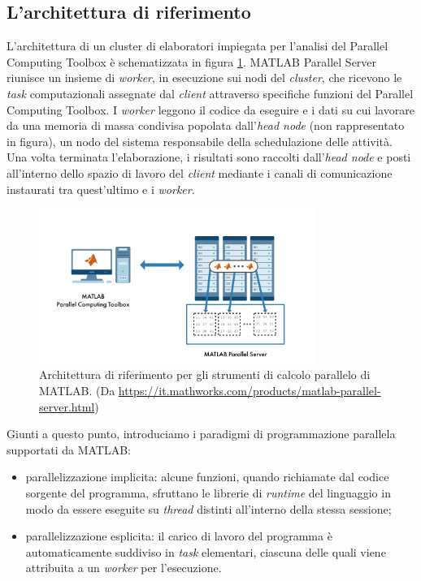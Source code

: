 \subsection{L'architettura di riferimento}
L'architettura di un cluster di elaboratori impiegata per l'analisi del Parallel Computing Toolbox \`e schematizzata in figura \ref{fig:ArchitetturaRiferimento}.\newline
MATLAB Parallel Server riunisce un insieme di \textit{worker}, in esecuzione sui nodi del \textit{cluster}, che ricevono le 
\textit{task} computazionali assegnate dal \textit{client} attraverso specifiche funzioni del Parallel Computing Toolbox. \newline
I \textit{worker} leggono il codice da eseguire e i dati su cui lavorare da una memoria di massa condivisa popolata dall'\textit{head node} 
(non rappresentato in figura), un nodo del sistema responsabile della schedulazione delle attivit\`a.\newline
Una volta terminata l'elaborazione, i risultati sono raccolti dall'\textit{head node} e posti all'interno dello spazio di lavoro del \textit{client} 
mediante i canali di comunicazione instaurati tra quest'ultimo e i \textit{worker}.

\begin{figure}[htbp]
    \centering
    \includegraphics[width=0.8\textwidth]{../Risorse/Capitolo 2/ReferenceArchitecture.png}
    \caption{Architettura di riferimento per gli strumenti di calcolo parallelo di MATLAB. 
    \small{(Da \url{https://it.mathworks.com/products/matlab-parallel-server.html})}}
    \label{fig:ArchitetturaRiferimento}
\end{figure}

Giunti a questo punto, introduciamo i paradigmi di programmazione parallela supportati da MATLAB:
\begin{itemize}
    \item parallelizzazione implicita: alcune funzioni, quando richiamate dal codice sorgente del programma, sfruttano le librerie di \textit{runtime} del linguaggio 
    in modo da essere eseguite su \textit{thread} distinti all'interno della stessa sessione;
    \item parallelizzazione esplicita: il carico di lavoro del programma \`e automaticamente suddiviso in \textit{task} elementari, ciascuna delle quali viene 
    attribuita a un \textit{worker} per l'esecuzione.
\end{itemize}


